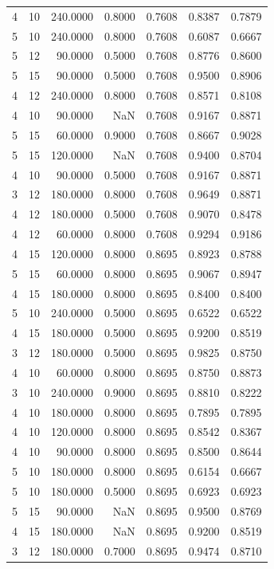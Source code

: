 \begin{tabular}{rrrrrrr}
4 & 10 & 240.0000 & 0.8000 & 0.7608 & 0.8387 & 0.7879 \\
5 & 10 & 240.0000 & 0.8000 & 0.7608 & 0.6087 & 0.6667 \\
5 & 12 & 90.0000 & 0.5000 & 0.7608 & 0.8776 & 0.8600 \\
5 & 15 & 90.0000 & 0.5000 & 0.7608 & 0.9500 & 0.8906 \\
4 & 12 & 240.0000 & 0.8000 & 0.7608 & 0.8571 & 0.8108 \\
4 & 10 & 90.0000 & NaN & 0.7608 & 0.9167 & 0.8871 \\
5 & 15 & 60.0000 & 0.9000 & 0.7608 & 0.8667 & 0.9028 \\
5 & 15 & 120.0000 & NaN & 0.7608 & 0.9400 & 0.8704 \\
4 & 10 & 90.0000 & 0.5000 & 0.7608 & 0.9167 & 0.8871 \\
3 & 12 & 180.0000 & 0.8000 & 0.7608 & 0.9649 & 0.8871 \\
4 & 12 & 180.0000 & 0.5000 & 0.7608 & 0.9070 & 0.8478 \\
4 & 12 & 60.0000 & 0.8000 & 0.7608 & 0.9294 & 0.9186 \\
4 & 15 & 120.0000 & 0.8000 & 0.8695 & 0.8923 & 0.8788 \\
5 & 15 & 60.0000 & 0.8000 & 0.8695 & 0.9067 & 0.8947 \\
4 & 15 & 180.0000 & 0.8000 & 0.8695 & 0.8400 & 0.8400 \\
5 & 10 & 240.0000 & 0.5000 & 0.8695 & 0.6522 & 0.6522 \\
4 & 15 & 180.0000 & 0.5000 & 0.8695 & 0.9200 & 0.8519 \\
3 & 12 & 180.0000 & 0.5000 & 0.8695 & 0.9825 & 0.8750 \\
4 & 10 & 60.0000 & 0.8000 & 0.8695 & 0.8750 & 0.8873 \\
3 & 10 & 240.0000 & 0.9000 & 0.8695 & 0.8810 & 0.8222 \\
4 & 10 & 180.0000 & 0.8000 & 0.8695 & 0.7895 & 0.7895 \\
4 & 10 & 120.0000 & 0.8000 & 0.8695 & 0.8542 & 0.8367 \\
4 & 10 & 90.0000 & 0.8000 & 0.8695 & 0.8500 & 0.8644 \\
5 & 10 & 180.0000 & 0.8000 & 0.8695 & 0.6154 & 0.6667 \\
5 & 10 & 180.0000 & 0.5000 & 0.8695 & 0.6923 & 0.6923 \\
5 & 15 & 90.0000 & NaN & 0.8695 & 0.9500 & 0.8769 \\
4 & 15 & 180.0000 & NaN & 0.8695 & 0.9200 & 0.8519 \\
3 & 12 & 180.0000 & 0.7000 & 0.8695 & 0.9474 & 0.8710 \\

\end{tabular}
